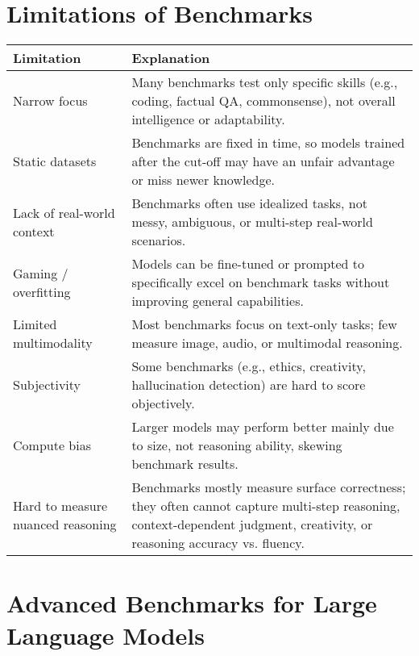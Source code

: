 \documentclass[a4paper, 12pt]{article}
\begin{document}
\vspace{1em}

\section*{Limitations of Benchmarks}

\begin{tabularx}{\textwidth}{|>{\hsize}L|>{\hsize}L|}
\hline
\textbf{Limitation} & \textbf{Explanation} \\
\hline
Narrow focus & Many benchmarks test only specific skills (e.g., coding, factual QA, commonsense), not overall intelligence or adaptability. \\
\hline
Static datasets & Benchmarks are fixed in time, so models trained after the cut-off may have an unfair advantage or miss newer knowledge. \\
\hline
Lack of real-world context & Benchmarks often use idealized tasks, not messy, ambiguous, or multi-step real-world scenarios. \\
\hline
Gaming / overfitting & Models can be fine-tuned or prompted to specifically excel on benchmark tasks without improving general capabilities. \\
\hline
Limited multimodality & Most benchmarks focus on text-only tasks; few measure image, audio, or multimodal reasoning. \\
\hline
Subjectivity & Some benchmarks (e.g., ethics, creativity, hallucination detection) are hard to score objectively. \\
\hline
Compute bias & Larger models may perform better mainly due to size, not reasoning ability, skewing benchmark results. \\
\hline
Hard to measure nuanced reasoning & Benchmarks mostly measure surface correctness; they often cannot capture multi-step reasoning, context-dependent judgment, creativity, or reasoning accuracy vs. fluency. \\
\hline
\end{tabularx}

\section*{Advanced Benchmarks for Large Language Models}
\end{document}
